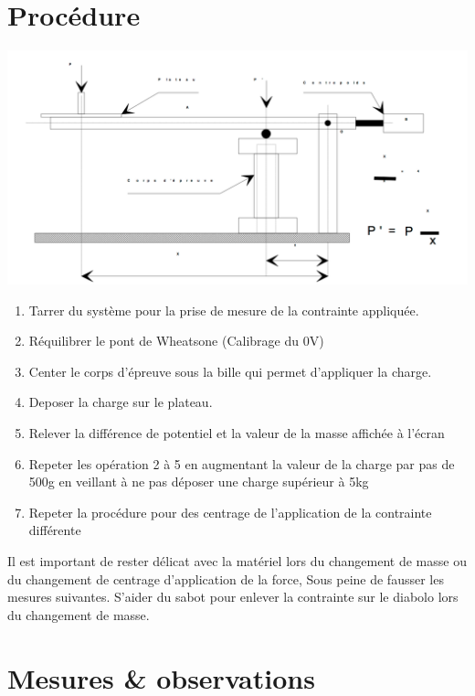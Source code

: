 \documentclass[11pt,a4paper]{report}
\begin{document}
\section*{Procédure}
\begin{center}
\includegraphics[scale=0.3]{Montage.jpg}
\end{center}
\begin{enumerate}
\item Tarrer du système pour la prise de mesure de la contrainte appliquée.									
\item Réquilibrer le pont de Wheatsone (Calibrage du 0V)
\item Center le corps d'épreuve sous la bille qui permet d'appliquer la charge.
\item Deposer la charge sur le plateau.
\item Relever la différence de potentiel  et la valeur de la masse affichée à l'écran
\item Repeter les opération 2 à 5 en augmentant la valeur de la charge par pas de 500g en veillant à ne pas déposer une charge supérieur à 5kg
\item Repeter la procédure pour des centrage de l'application de la contrainte différente
\end{enumerate} 


Il est important de rester délicat avec la matériel lors du changement de masse ou du changement de centrage d'application de la force, Sous peine de fausser les mesures suivantes. S'aider du sabot pour enlever la contrainte sur le diabolo lors du changement de masse.
\newpage
\section*{Mesures \& observations}
\end{document}
